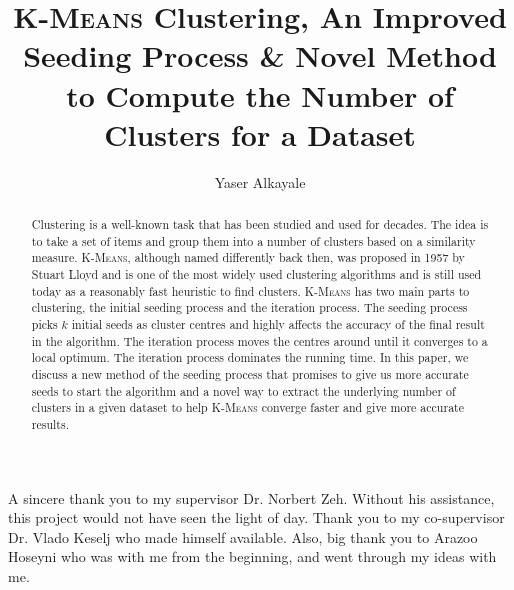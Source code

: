 \documentclass[12pt]{dalthesis}
\newcommand*{\kmeansn}{\textsc{K-Means}} %
\newcommand*{\kmeans}{\textsc{K-Means} } %
\DeclarePairedDelimiter\abs{\lvert}{\rvert}
\DeclarePairedDelimiter\norm{\lVert}{\rVert}
\begin{document}
\makeatletter
\let\oldabs\abs
\def\abs{\@ifstar{\oldabs}{\oldabs*}}
\let\oldnorm\norm
\def\norm{\@ifstar{\oldnorm}{\oldnorm*}}
\def\BState{\State\hskip-\ALG@thistlm}
\makeatother

\title{\kmeans Clustering, An Improved Seeding Process \& Novel Method to Compute the Number of Clusters for a Dataset}
\author{Yaser Alkayale}
\bcshon  %

\nolistoftables
\nolistoffigures

\frontmatter

\begin{abstract}
  Clustering is a well-known task that has been studied and used for decades. The idea is to take a set of items and group them into a number of clusters based on a similarity measure. \kmeansn, although named differently back then, was proposed in 1957 by Stuart Lloyd and is one of the most widely used clustering algorithms and is still used today as a reasonably fast heuristic to find clusters. \kmeans has two main parts to clustering, the initial seeding process and the iteration process. The seeding process picks $k$ initial seeds as cluster centres and highly affects the accuracy of the final result in the algorithm. The iteration process moves the centres around until it converges to a local optimum. The iteration process dominates the running time. In this paper, we discuss a new method of the seeding process that promises to give us more accurate seeds to start the algorithm and a novel way to extract the underlying number of clusters in a given dataset to help \kmeans converge faster and give more accurate results.
\end{abstract}


\begin{acknowledgements}

  A sincere thank you to my supervisor Dr. Norbert Zeh. Without his assistance, this project would not have seen the light of day. Thank you to my co-supervisor Dr. Vlado Keselj who made himself available. Also, big thank you to Arazoo Hoseyni who was with me from the beginning, and went through my ideas with me.

\end{acknowledgements}
\end{document}
